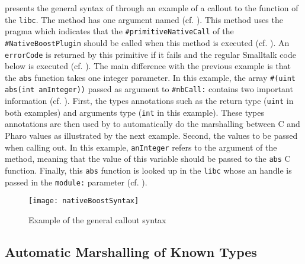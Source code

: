  presents the general syntax of \NBFFI through an example of a callout to the  function of the \texttt{libc}.
The  method has one argument named  (cf. ).
This method uses the pragma  which indicates that the \texttt{\#primitiveNativeCall} of the \texttt{\#NativeBoostPlugin} should be called when this method is executed (cf. ).
An \texttt{errorCode} is returned by this primitive if it fails and the regular Smalltalk code below is executed (cf. ).
The main difference with the previous example is that the \texttt{abs} function takes one integer parameter.
In this example, the array \texttt{\#(uint abs(int anInteger))} passed as argument to \texttt{\#nbCall:} contains two important information (cf. ).
First, the types annotations such as the return type (\texttt{uint} in both examples) and arguments type (\texttt{int} in this example).
These types annotations are then used by \NBFFI to automatically do the marshalling between C and Pharo values as illustrated by the next example.
Second, the values to be passed when calling out.
In this example, \texttt{anInteger} refers to the argument of the  method, meaning that the value of this variable should be passed to the \texttt{abs} C function.
Finally, this \texttt{abs} function is looked up in the \texttt{libc} whose an handle is passed in the \texttt{module:} parameter (cf. ).
%
%
\begin{figure}[H]
	\centering
	\texttt{[image: nativeBoostSyntax]}
	\caption[\NB basic method]{Example of the general \NBFFI callout syntax}
\end{figure}

\subsection{Automatic Marshalling of Known Types}


